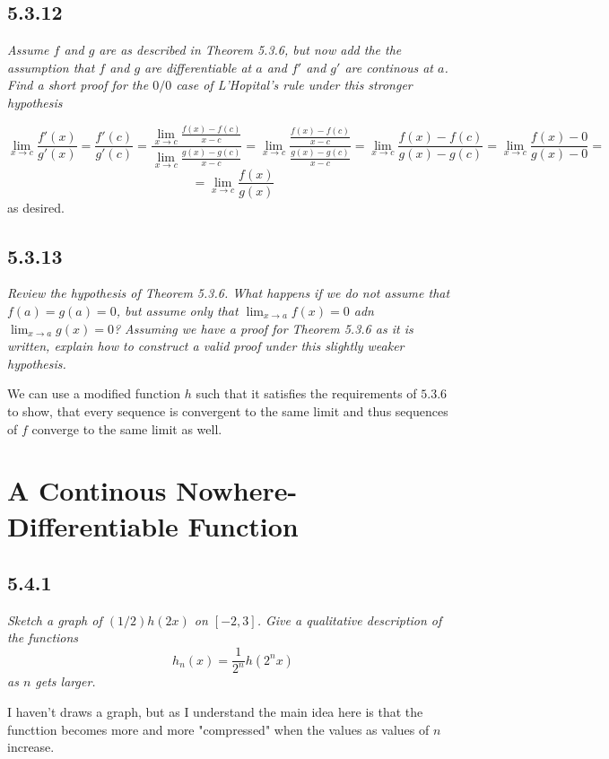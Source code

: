 \documentclass[11pt,oneside,titlepage]{book}
\begin{document}
\subsection*{5.3.12}
\textit{Assume $f$ and $g$ are as described in Theorem 5.3.6, but now add the
  the assumption that $f$ and $g$ are differentiable at $a$ and $f'$ and $g'$
  are continous at $a$. Find a short proof for the $0/0$ case of L'Hopital's
  rule under this stronger hypothesis}

$$\lim_{x \to c}\frac{f'(x)}{g'(x)} = \frac{f'(c)}{g'(c)} =
\frac{\lim_{x \to c}\frac{f(x) - f(c)}{x - c}}
{\lim_{x \to c}\frac{g(x) - g(c)}{x - c}} =
\lim_{x \to c} \frac{\frac{f(x) - f(c)}{x - c}}
{\frac{g(x) - g(c)}{x - c}} =
\lim_{x \to c} \frac{f(x) - f(c)} {g(x) - g(c)} =
\lim_{x \to c} \frac{f(x) - 0} {g(x) - 0} =$$
$$ = \lim_{x \to c} \frac{f(x)} {g(x)}$$
as desired.

\subsection*{5.3.13}
\textit{Review the hypothesis of Theorem 5.3.6. What happens if we do not
  assume that $f(a) = g(a) = 0$, but assume only that $\lim_{x \to a}f(x) = 0$
  adn $\lim_{x \to a} g(x) = 0$? Assuming we have a proof for Theorem 5.3.6
  as it is written, explain how to construct a valid proof under this
  slightly weaker hypothesis.}

We can use a modified function $h$ such that it satisfies the requirements of
$5.3.6$ to show, that every sequence is convergent to the same limit and thus
sequences of $f$ converge to the same limit as well.

\section{A Continous Nowhere-Differentiable Function}

\subsection*{5.4.1}

\textit{Sketch a graph of $(1/2)h(2x)$ on $[-2, 3]$. Give a qualitative
  description of the functions}
$$h_n(x) = \frac{1}{2^n}h(2^nx)$$
\textit{as $n$ gets larger.}

I haven't draws a graph, but as I understand the main idea here is that the
functtion becomes more and more "compressed" when the values as values
of $n$ increase.
\end{document}
